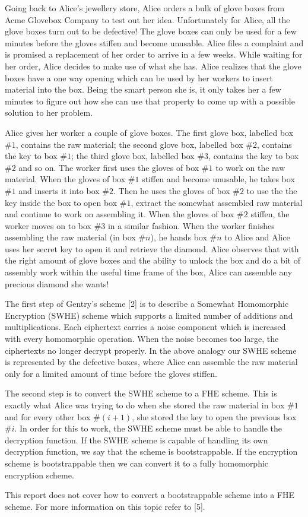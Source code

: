 \documentclass[../../main.tex]{subfiles}
\begin{document}
Going back to Alice's jewellery store, Alice orders a bulk of glove boxes from Acme Glovebox Company to test out her idea. Unfortunately for Alice, all the glove boxes turn out to be defective! The glove boxes can only be used for a few minutes before the gloves stiffen and become unusable. Alice files a complaint and is promised a replacement of her order to arrive in a few weeks. While waiting for her order, Alice decides to make use of what she has. Alice realizes that the glove boxes have a one way opening which can be used by her workers to insert material into the box. Being the smart person she is, it only takes her a few minutes to figure out how she can use that property to come up with a possible solution to her problem. 

Alice gives her worker a couple of glove boxes. The first glove box, labelled box $\#1$, contains the raw material; the second glove box, labelled box $\#2$, contains the key to box $\#1$; the third glove box, labelled box $\#3$, contains the key to box $\#2$ and so on. The worker first uses the gloves of box $\#1$ to work on the raw material. When the gloves of box $\#1$ stiffen and become unusable, he takes box $\#1$ and inserts it into box $\#2$. Then he uses the gloves of box $\#2$ to use the the key inside the box to open box $\#1$, extract the somewhat assembled raw material and continue to work on assembling it. When the gloves of box $\#2$ stiffen, the worker moves on to box $\#3$ in a similar fashion. When the worker finishes assembling the raw material (in box $\#n$), he hands box $\#n$ to Alice and Alice uses her secret key to open it and retrieve the diamond. Alice observes that with the right amount of glove boxes and the ability to unlock the box and do a bit of assembly work within the useful time frame of the box, Alice can assemble any precious diamond she wants!

The first step of Gentry's scheme [2] is to describe a Somewhat Homomorphic Encryption (SWHE) scheme which supports a limited number of additions and multiplications. Each ciphertext carries a noise component which is increased with every homomorphic operation. When the noise becomes too large, the ciphertexts no longer decrypt properly. In the above analogy our SWHE scheme is represented by the defective boxes, where Alice can assemble the raw material only for a limited amount of time before the gloves stiffen.

The second step is to convert the SWHE scheme to a FHE scheme. This is exactly what Alice was trying to do when she stored the raw material in box $\#1$ and for every other box $\#(i+1)$, she stored the key to open the previous box $\#i$. In order for this to work, the SWHE scheme must be able to handle the decryption function. If the SWHE scheme is capable of handling its own decryption function, we say that the scheme is bootstrappable. If the encryption scheme is bootstrappable then we can convert it to a fully homomorphic encryption scheme.

This report does not cover how to convert a bootstrappable scheme into a FHE scheme. For more information on this topic refer to [5].
\end{document}
